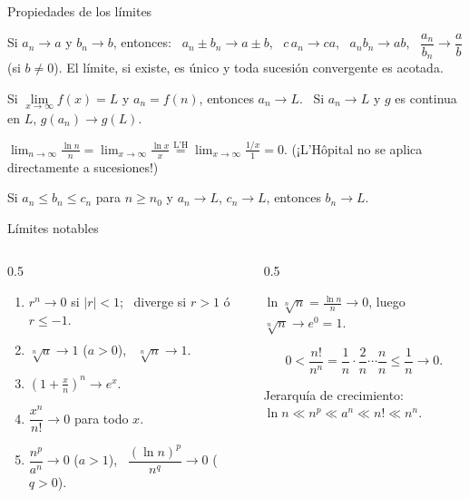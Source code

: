 \documentclass[10pt,aspectratio=169]{beamer}
\begin{document}
\begin{frame}{Propiedades de los límites}
  \begin{teorema}
    Si $a_n\to a$ y $b_n\to b$, entonces: \ $a_n\pm b_n\to a\pm b$, \ $c\,a_n\to ca$, \ $a_nb_n\to ab$,
    \ $\dfrac{a_n}{b_n}\to\dfrac ab$ (si $b\ne0$). El límite, si existe, es único y toda sucesión convergente es acotada.
  \end{teorema}
  \begin{teorema}
    Si $\lim\limits_{x\to\infty}f(x)=L$ y $a_n=f(n)$, entonces $a_n\to L$. \ Si $a_n\to L$ y $g$ es continua en $L$, $g(a_n)\to g(L)$.
  \end{teorema}
  \begin{ejemplo}
    $\displaystyle\lim_{n\to\infty}\frac{\ln n}{n}=\lim_{x\to\infty}\frac{\ln x}{x}\overset{\text{L'H}}{=}\lim_{x\to\infty}\frac{1/x}{1}=0$.
    \qquad (¡L'Hôpital no se aplica directamente a sucesiones!)
  \end{ejemplo}
  \begin{teorema}[Sándwich]
    Si $a_n\le b_n\le c_n$ para $n\ge n_0$ y $a_n\to L$, $c_n\to L$, entonces $b_n\to L$.
  \end{teorema}
\end{frame}

\begin{frame}{Límites notables}
  \begin{columns}
    \begin{column}{0.5\textwidth}
      \begin{proposicion}
        \begin{enumerate}
          \item $r^n\to0$ si $|r|<1$; \ diverge si $r>1$ ó $r\le-1$.
          \item $\sqrt[n]{a}\to1$ ($a>0$), \ $\sqrt[n]{n}\to1$.
          \item $\left(1+\frac xn\right)^n\to e^x$.
          \item $\dfrac{x^n}{n!}\to0$ para todo $x$.
          \item $\dfrac{n^p}{a^n}\to0$ ($a>1$), \ $\dfrac{(\ln n)^p}{n^q}\to0$ ($q>0$).
        \end{enumerate}
      \end{proposicion}
    \end{column}
    \begin{column}{0.5\textwidth}
      \begin{ejemplo}[{$\sqrt[n]{n}\to1$}]
        $\ln\sqrt[n]n=\frac{\ln n}{n}\to0$, luego $\sqrt[n]n\to e^0=1$.
      \end{ejemplo}
      \begin{ejemplo}
        \[ 0<\frac{n!}{n^n}=\frac1n\cdot\frac2n\cdots\frac nn\le\frac1n\to0. \]
      \end{ejemplo}
      \begin{idea}
        Jerarquía de crecimiento:\\ $\ln n\ll n^p\ll a^n\ll n!\ll n^n$.
      \end{idea}
    \end{column}
  \end{columns}
\end{frame}
\end{document}
